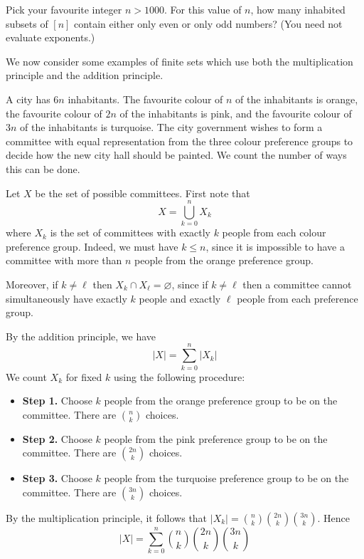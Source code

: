 \begin{exercise}
Pick your favourite integer $n > 1000$. For this value of $n$, how many inhabited subsets of $[n]$ contain either only even or only odd numbers? (You need not evaluate exponents.)
\end{exercise}

We now consider some examples of finite sets which use both the multiplication principle and the addition principle.

\begin{example}
\label{exCityColour}
A city has $6n$ inhabitants. The favourite colour of $n$ of the inhabitants is orange, the favourite colour of $2n$ of the inhabitants is pink, and the favourite colour of $3n$ of the inhabitants is turquoise. The city government wishes to form a committee with equal representation from the three colour preference groups to decide how the new city hall should be painted. We count the number of ways this can be done.

Let $X$ be the set of possible committees. First note that
\[ X = \bigcup_{k=0}^n X_k \]
where $X_k$ is the set of committees with exactly $k$ people from each colour preference group. Indeed, we must have $k \le n$, since it is impossible to have a committee with more than $n$ people from the orange preference group.

Moreover, if $k \ne \ell$ then $X_k \cap X_{\ell} = \varnothing$, since if $k \ne \ell$ then a committee cannot simultaneously have exactly $k$ people and exactly $\ell$ people from each preference group.

By the addition principle, we have
\[ |X| = \sum_{k=0}^n |X_k| \]
We count $X_k$ for fixed $k$ using the following procedure:
\begin{itemize}
\item \textbf{Step 1.} Choose $k$ people from the orange preference group to be on the committee. There are $\binom{n}{k}$ choices.
\item \textbf{Step 2.} Choose $k$ people from the pink preference group to be on the committee. There are $\binom{2n}{k}$ choices.
\item \textbf{Step 3.} Choose $k$ people from the turquoise preference group to be on the committee. There are $\binom{3n}{k}$ choices.
\end{itemize}
By the multiplication principle, it follows that $|X_k| = \binom{n}{k} \binom{2n}{k} \binom{3n}{k}$. Hence
\[ |X| = \sum_{k=0}^n \binom{n}{k} \binom{2n}{k} \binom{3n}{k} \]
\end{example}


